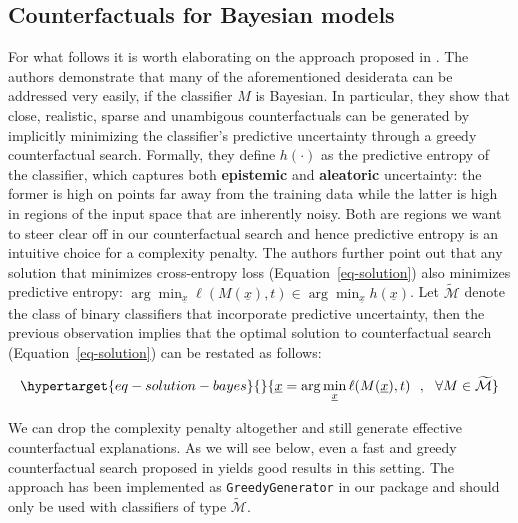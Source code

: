 \documentclass[
  letterpaper,
  DIV=11,
  numbers=noendperiod]{scrartcl}
\begin{document}
\hypertarget{counterfactuals-for-bayesian-models}{%
\subsection{Counterfactuals for Bayesian
models}\label{counterfactuals-for-bayesian-models}}

For what follows it is worth elaborating on the approach proposed in
\cite{schut2021generating}. The authors demonstrate that many of the
aforementioned desiderata can be addressed very easily, if the
classifier \(M\) is Bayesian. In particular, they show that close,
realistic, sparse and unambigous counterfactuals can be generated by
implicitly minimizing the classifier's predictive uncertainty through a
greedy counterfactual search. Formally, they define \(h(\cdot)\) as the
predictive entropy of the classifier, which captures both
\textbf{epistemic} and \textbf{aleatoric} uncertainty: the former is
high on points far away from the training data while the latter is high
in regions of the input space that are inherently noisy. Both are
regions we want to steer clear off in our counterfactual search and
hence predictive entropy is an intuitive choice for a complexity
penalty. The authors further point out that any solution that minimizes
cross-entropy loss (Equation~\ref{eq-solution}) also minimizes
predictive entropy:
\(\arg \min _{\underline{x}} \ell(M(\underline{x}),t) \in \arg \min _{\underline{x}} h(\underline{x})\).
Let \(\mathcal{\widetilde{M}}\) denote the class of binary classifiers
that incorporate predictive uncertainty, then the previous observation
implies that the optimal solution to counterfactual search
(Equation~\ref{eq-solution}) can be restated as follows:

\begin{equation}\protect\hypertarget{eq-solution-bayes}{}{
\underline{x} = \arg \min_{\underline{x}}  \ell(M(\underline{x}),t) \ \ , \ \  \forall M\in\mathcal{\widetilde{M}}
}\label{eq-solution-bayes}\end{equation}

We can drop the complexity penalty altogether and still generate
effective counterfactual explanations. As we will see below, even a fast
and greedy counterfactual search proposed in \cite{schut2021generating}
yields good results in this setting. The approach has been implemented
as \texttt{GreedyGenerator} in our package and should only be used with
classifiers of type \(\mathcal{\widetilde{M}}\).
\end{document}

